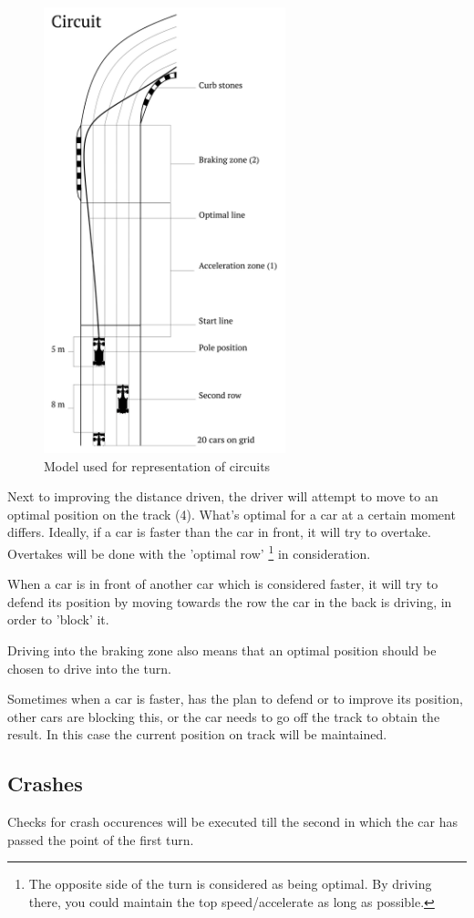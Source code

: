 \begin{figure}[H]
\includegraphics[width=7cm]{f1start-01}
\caption{Model used for representation of circuits}
\end{figure}

Next to improving the distance driven, the driver will attempt to move to an optimal position on the track (4). What's optimal for a car at a certain moment differs. Ideally, if a car is faster than the car in front, it will try to overtake. Overtakes will be done with the 'optimal row' \footnote{The opposite side of the turn is considered as being optimal. By driving there, you could maintain the top speed/accelerate as long as possible.} in consideration.

When a car is in front of another car which is considered faster, it will try to defend its position by moving towards the row the car in the back is driving, in order to 'block' it.

Driving into the braking zone also means that an optimal position should be chosen to drive into the turn.

Sometimes when a car is faster, has the plan to defend or to improve its position, other cars are blocking this, or the car needs to go off the track to obtain the result. In this case the current position on track will be maintained.

\subsection{Crashes}
Checks for crash occurences will be executed till the second in which the car has passed the point of the first turn.

